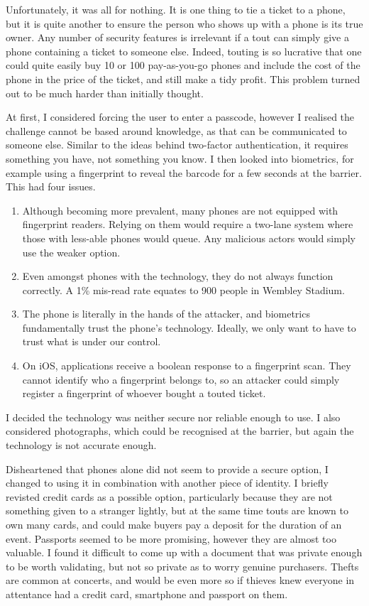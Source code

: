 \documentclass[12pt]{bhamdissertation}
\begin{document}
Unfortunately, it was all for nothing. It is one thing to tie a ticket to a phone, but it is quite another to ensure the person who shows up with a phone is its true owner. Any number of security features is irrelevant if a tout can simply give a phone containing a ticket to someone else. Indeed, touting is so lucrative that one could quite easily buy 10 or 100 pay-as-you-go phones and include the cost of the phone in the price of the ticket, and still make a tidy profit. This problem turned out to be much harder than initially thought.

At first, I considered forcing the user to enter a passcode, however I realised the challenge cannot be based around knowledge, as that can be communicated to someone else. Similar to the ideas behind two-factor authentication, it requires something you have, not something you know. I then looked into biometrics, for example using a fingerprint to reveal the barcode for a few seconds at the barrier. This had four issues.

\begin{enumerate}
    \item Although becoming more prevalent, many phones are not equipped with fingerprint readers. Relying on them would require a two-lane system where those with less-able phones would queue. Any malicious actors would simply use the weaker option.
    \item Even amongst phones with the technology, they do not always function correctly. A 1\% mis-read rate equates to 900 people in Wembley Stadium.
    \item The phone is literally in the hands of the attacker, and biometrics fundamentally trust the phone's technology. Ideally, we only want to have to trust what is under our control.
    \item On iOS, applications receive a boolean response to a fingerprint scan. They cannot identify who a fingerprint belongs to, so an attacker could simply register a fingerprint of whoever bought a touted ticket.
\end{enumerate}

I decided the technology was neither secure nor reliable enough to use. I also considered photographs, which could be recognised at the barrier, but again the technology is not accurate enough.

Disheartened that phones alone did not seem to provide a secure option, I changed to using it in combination with another piece of identity. I briefly revisted credit cards as a possible option, particularly because they are not something given to a stranger lightly, but at the same time touts are known to own many cards, and could make buyers pay a deposit for the duration of an event. Passports seemed to be more promising, however they are almost too valuable. I found it difficult to come up with a document that was private enough to be worth validating, but not so private as to worry genuine purchasers. Thefts are common at concerts, and would be even more so if thieves knew everyone in attentance had a credit card, smartphone and passport on them.
\end{document}
